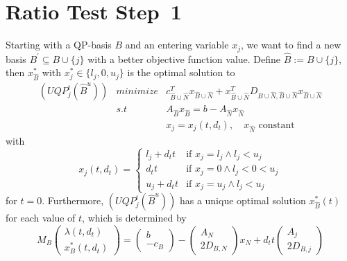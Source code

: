 \documentclass[a4paper]{article}
\begin{document}
\section{Ratio Test Step~1}
Starting with a QP-basis $B$ and an entering variable $x_{j}$, we want to find a
new basis $B^{\prime} \subseteq B \cup \{j\}$ with a better objective function
value. Define $\hat{B}:=B \cup \{j\}$, then $x_{\hat{B}}^{*}$ with
$x_{j}^{*} \in \{l_{j}, 0, u_{j}\}$ is the optimal solution to
\begin{eqnarray}
\label{QP:UQP_UB_t}
(UQP_{j}^{t}(\hat{B}^{u})) & minimize &
  c_{\hat{B} \cup \hat{N}}^{T}x_{\hat{B} \cup \hat{N}}
  + x_{\hat{B} \cup \hat{N}}^{T}
  D_{\hat{B} \cup \hat{N},\hat{B} \cup \hat{N}}
  x_{\hat{B} \cup \hat{N}}  \nonumber \\
  & s.t & A_{\hat{B}}x_{\hat{B}} =
  b - A_{\hat{N}}x_{\hat{N}} \\
  & & x_{j} = x_{j}(t, d_{t}), \quad x_{\hat{N}} \text{ constant}
  \nonumber
\end{eqnarray}
with
\begin{equation}
x_{j}(t, d_{t})=
\left\{
\begin{array}{ll}
l_{j}+d_{t}t
&
\text{if $x_{j}=l_{j} \wedge l_{j}<u_{j}$} \\
d_{t}t
&
\text{if $x_{j}=0 \wedge l_{j} < 0 < u_{j}$} \\
u_{j}+d_{t}t
&
\text{if $x_{j}=u_{j} \wedge l_{j}<u_{j}$}
\end{array}
\right.
\end{equation}
for $t=0$. Furthermore, $(UQP_{j}^{t}(\hat{B}^{u}))$ has a unique optimal
solution $x_{\hat{B}}^{*}(t)$ for each value of $t$, which is determined by
\begin{equation}
M_{B}
\left(
\begin{array}{c}
\lambda(t, d_{t}) \\
\hline
x_{B}^{*}(t, d_{t})
\end{array}
\right)
=
\left(
\begin{array}{c}
b \\
\hline
-c_{B}
\end{array}
\right)
-
\left(
\begin{array}{c}
A_{N} \\
\hline
2D_{B, N}
\end{array}
\right)
x_{N}
+d_{t}t
\left(
\begin{array}{c}
A_{j} \\
\hline
2D_{B, j}
\end{array}
\right)
\end{equation}
\end{document}
